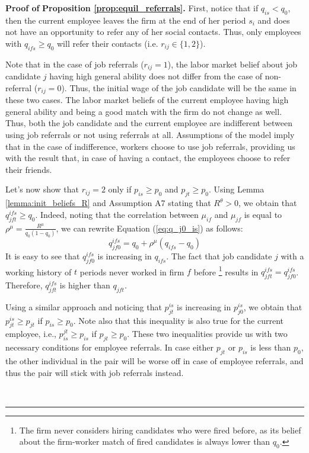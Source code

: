 \documentclass[12pt]{article}
\newenvironment{proof}[1][Proof of]{\noindent\textbf{#1} }{\ \rule{0.5em}{0.5em}}
\begin{document}
\begin{proof}
    \textbf{Proposition \ref{prop:equil_referrals}.} 
    First, notice that if \(q_{is} < q_0\), then the current employee leaves the firm at the end of her period \(s_i\) and does not have an opportunity to refer any of her social contacts. Thus, only employees with \(q_{ifs} \geq q_0\) will refer their contacts (i.e. \(r_{ij} \in \lbrace 1,2 \rbrace\)).

    Note that in the case of job referrals (\(r_{ij}=1\)), the labor market belief about job candidate \(j\) having high general ability does not differ from the case of non-referral (\(r_{ij} = 0\)). Thus, the initial wage of the job candidate will be the same in these two cases. The labor market beliefs of the current employee having high general ability and being a good match with the firm do not change as well. Thus, both the job candidate and the current employee are indifferent between using job referrals or not using referrals at all. Assumptions of the model imply that in the case of indifference, workers choose to use job referrals, providing us with the result that, in case of having a contact, the employees choose to refer their friends.

    Let's now show that \(r_{ij} = 2\) only if \(p_{is} \geq p_0\) and \(p_{jt} \geq p_0\). Using Lemma \ref{lemma:init_beliefs_R} and Assumption A7 stating that \(R^\theta >0\), we obtain that \(q_{jft}^{ifs} \geq q_0\). Indeed, noting that the correlation between \(\mu_{if}\) and \(\mu_{jf}\) is equal to \(\rho^\mu = \frac{R^\mu}{q_0(1-q_0)}\), we can rewrite Equation (\ref{eq:q_j0_is}) as follows:
    \begin{equation*}
        q_{jf0}^{ifs} = q_0 + \rho^\mu(q_{ifs} - q_0)
    \end{equation*}
    It is easy to see that \(q_{jf0}^{ifs}\) is increasing in \(q_{ifs}\). The fact that job candidate \(j\) with a working history of \(t\) periods never worked in firm \(f\) before \footnote{The firm never considers hiring candidates who were fired before, as its belief about the firm-worker match of fired candidates is always lower than \(q_0\).} results in \(q_{jft}^{ifs} = q_{jf0}^{ifs}\). Therefore, \(q_{jft}^{ifs}\) is higher than \(q_{jft}\).

    Using a similar approach and noticing that \(p_{jt}^{is}\) is increasing in \(p_{j0}^{is}\), we obtain that \(p_{jt}^{is} \geq p_{jt}\) if \(p_{is} \geq p_0\). Note also that this inequality is also true for the current employee, i.e., \(p^{jt}_{is} \geq p_{is}\) if \(p_{jt} \geq p_0\). These two inequalities provide us with two necessary conditions for employee referrals. In case either \(p_{jt}\) or \(p_{is}\) is less than \(p_0\), the other individual in the pair will be worse off in case of employee referrals, and thus the pair will stick with job referrals instead.


\end{proof}
\end{document}
